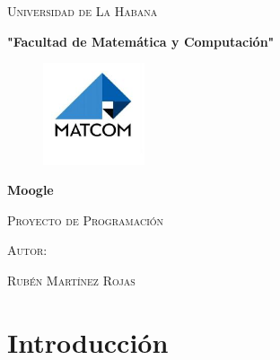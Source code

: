 \documentclass[12pt, a4paper]{article}
\begin{document}
\begin{titlepage}
      \centering
      {\scshape\LARGE Universidad de La Habana\par}
      \vspace{1cm}
      {\bfseries\large "Facultad de Matemática y Computación"\par}
      \vspace{1cm}
      \begin{figure}[h]
            \centering
            \includegraphics[width=3cm]{matcom.jpg}
      \end{figure}
      \vspace{1cm}
      {\bfseries\LARGE Moogle \par}
      \vspace{1cm}
      {\scshape\large Proyecto de Programación \par}
      \vspace{3cm}
      {\scshape\large Autor: \par}
      \vspace{0.5cm}
      {\scshape\large Rubén Martínez Rojas \par}
\end{titlepage}

\newpage
\tableofcontents

\newpage
\begin{abstract}
      Moogle es una página web creada con el fin de buscar
      un texto en un grupo de archivos. Para su funcionamiento
      utiliza un Sistema de Recuperación de Información
      desarrollado en lenguaje $C\#$
\end{abstract}

\section{Introducción}
\end{document}
